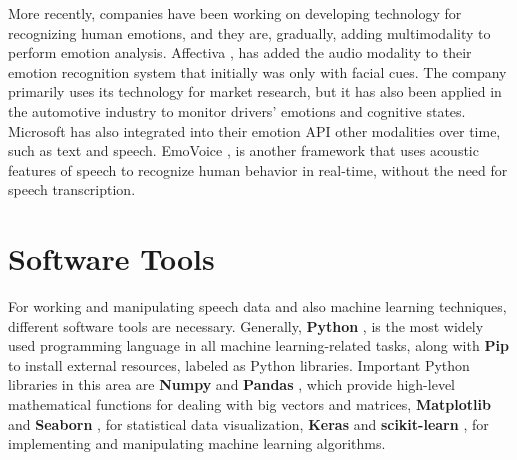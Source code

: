 More recently, companies have been working on developing technology for recognizing human emotions, and they are, gradually, adding multimodality to perform emotion analysis. Affectiva \cite{affectiva}, has added the audio modality to their emotion recognition system that initially was only with facial cues. The company primarily uses its technology for market research, but it has also been applied in the automotive industry to monitor drivers' emotions and cognitive states. Microsoft \cite{microsoftservice} has also integrated into their emotion API other modalities over time, such as text and speech. EmoVoice \cite{Wagner13}, is another framework that uses acoustic features of speech to recognize human behavior in real-time, without the need for speech transcription.


\section{Software Tools}

For working and manipulating speech data and also machine learning techniques, different software tools are necessary. Generally, \textbf{Python} \cite{van1995python}, is the most widely used programming language in all machine learning-related tasks, along with \textbf{Pip} \cite{pypi} to install external resources, labeled as Python libraries. Important Python libraries in this area are \textbf{Numpy} \cite{2020NumPyArray} and \textbf{Pandas} \cite{mckinney2010data}, which provide high-level mathematical functions for dealing with big vectors and matrices, \textbf{Matplotlib} \cite{hunter2007matplotlib} and \textbf{Seaborn} \cite{michael_waskom_2017_883859}, for statistical data visualization, \textbf{Keras} \cite{gulli2017deep} and \textbf{scikit-learn} \cite{pedregosa2011scikit}, for implementing and manipulating machine learning algorithms.

